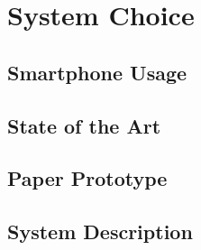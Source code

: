 \chapter{System Choice}


\section{Smartphone Usage}\label{sub:smartphone_usage}


\section{State of the Art}
\label{StateOfTheArt}


\section{Paper Prototype}


\section{System Description}\label{systemDefinition}

